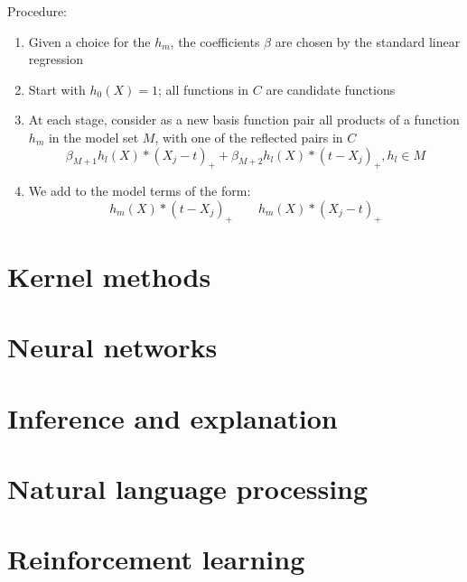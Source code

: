 \documentclass{article}
\begin{document}
        Procedure:
        \begin{enumerate}
            \item Given a choice for the $h_m$, the coefficients $\beta$ are chosen by the standard linear regression
            \item Start with $h_0(X) = 1$; all functions in $C$ are candidate functions
            \item At each stage, consider as a new basis function pair all products of a function $h_m$ in the model set $M$, with one of the reflected pairs in $C$
            \[ \beta_{M+1} h_l(X) * {(X_j - t)}_+ + \beta_{M+2} h_l(X) * {(t - X_j)}_+, h_l \in M \]
            \item We add to the model terms of the form: 
            \[ h_m(X) * {(t - X_j)}_+ \qquad h_m(X) * {(X_j - t)}_+ \]
        \end{enumerate}

    \newpage

\section{Kernel methods}
    \newpage

\section{Neural networks}
    \newpage

\section{Inference and explanation}
    \newpage

\section{Natural language processing}
    \newpage

\section{Reinforcement learning}
    \newpage
\end{document}
